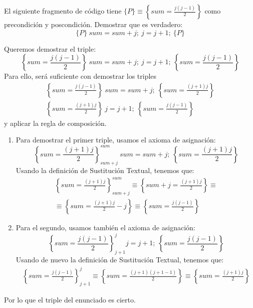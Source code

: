 \begin{ejercicio}
    El siguiente fragmento de código tiene $\{P\}\equiv \left\{sum = \frac{j(j-1)}{2}\right\}$ como precondición y poscondición. Demostrar que es verdadero:
    \begin{equation*}
        \{P\}\ sum=sum+j;\ j=j+1;\ \{P\}
    \end{equation*}

    Queremos demostrar el triple:
    \begin{equation*}
        \left\{sum=\frac{j(j-1)}{2} \right\}\ sum=sum+j;\ j=j+1;\ \left\{sum=\frac{j(j-1)}{2}\right\}
    \end{equation*}
    Para ello, será suficiente con demostrar los triples
    \begin{gather*}
        \left\{sum = \frac{j(j-1)}{2} \right\}\ sum = sum + j;\ \left\{sum = \frac{(j+1)j}{2} \right\} \\
        \left\{sum = \frac{(j+1)j}{2} \right\}\ j=j+1;\ \left\{sum = \frac{j(j-1)}{2}\right\}
    \end{gather*}
    y aplicar la regla de composición.

    \begin{enumerate}
        \item Para demostrar el primer triple, usamos el axioma de asignación:
            \begin{equation*}
                \left\{sum = \frac{(j+1)j}{2} \right\}^{sum}_{sum+j}\ sum = sum + j;\ \left\{sum = \frac{(j+1)j}{2} \right\} 
            \end{equation*}
            Usando la definición de Sustitución Textual, tenemos que:
            \begin{gather*}
                \left\{sum = \frac{(j+1)j}{2} \right\}^{sum}_{sum+j} \equiv \left\{sum+j = \frac{(j+1)j}{2} \right\} \equiv \\ 
                \equiv \left\{sum = \frac{(j+1)j}{2}-j \right\} \equiv \left\{sum = \frac{j(j-1)}{2} \right\}
            \end{gather*}
        \item Para el segundo, usamos también el axioma de asignación:
            \begin{equation*}
                \left\{sum = \frac{j(j-1)}{2}\right\}^j_{j+1} j=j+1;\ \left\{sum = \frac{j(j-1)}{2}\right\}
            \end{equation*}
            Usando de nuevo la definición de Sustitución Textual, tenemos que:
            \begin{gather*}
                \left\{sum = \frac{j(j-1)}{2}\right\}^j_{j+1} \equiv \left\{sum = \frac{(j+1)(j+1-1)}{2}\right\} \equiv \left\{sum = \frac{(j+1)j}{2}\right\}
            \end{gather*}
    \end{enumerate}
    Por lo que el triple del enunciado es cierto.

\end{ejercicio}


